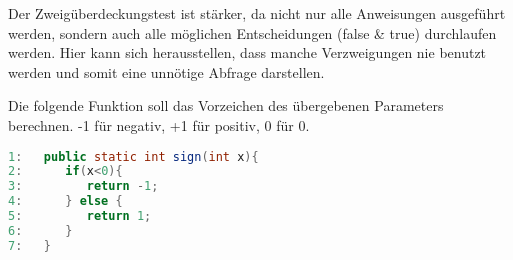 Der Zweigüberdeckungstest ist stärker, da nicht nur alle Anweisungen ausgeführt werden, sondern auch alle möglichen Entscheidungen
(false \& true) durchlaufen werden. Hier kann sich herausstellen, dass manche Verzweigungen nie benutzt werden und somit eine unnötige
Abfrage darstellen. 


Die folgende Funktion soll das Vorzeichen des übergebenen Parameters berechnen. -1 für negativ, +1 für positiv, 0 für 0.
\begin{lstlisting}[language=Java]
1:   public static int sign(int x){
2:      if(x<0){
3:         return -1;
4:      } else {
5:         return 1;
6:      }
7:   }
\end{lstlisting}

